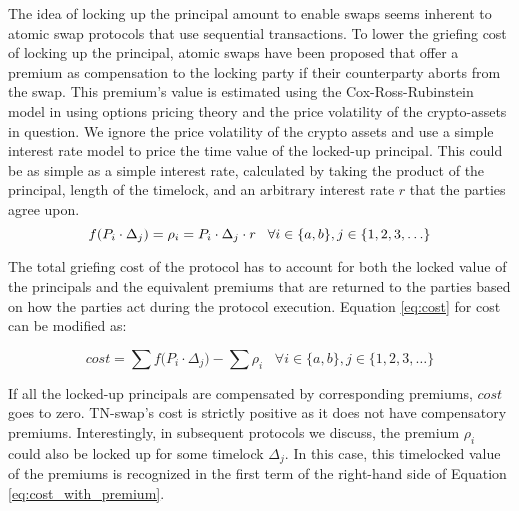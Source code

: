 The idea of locking up the principal amount to enable swaps seems inherent to atomic swap protocols that use sequential transactions. To lower the griefing cost of locking up the principal, atomic swaps have been proposed that offer a premium as compensation to the locking party if their counterparty aborts from the swap. This premium's value is estimated using the Cox-Ross-Rubinstein model in \cite{atomic_swaps_american_call_options} using options pricing theory and the price volatility of the crypto-assets in question. We ignore the price volatility of the crypto assets and use a simple interest rate model to price the time value of the locked-up principal. This could be as simple as a simple interest rate, calculated by taking the product of the principal, length of the timelock, and an arbitrary interest rate $r$ that the parties agree upon. 
\begin{equation} 
 f(P_i\cdot \Delta_j) = \rho_i = P_i \cdot \Delta_j \cdot r \;\;\; \forall i \in \{a, b\}, j \in \{1, 2, 3, \ldots\} \\
\end{equation}

The total griefing cost of the protocol has to account for both the locked value of the principals and the equivalent premiums that are returned to the parties based on how the parties act during the protocol execution. Equation \ref{eq:cost} for cost can be modified as:

\begin{equation} \label{eq:cost_with_premium}
 cost = \sum{f(P_i\cdot \Delta_j}) - \sum{\rho_i} \;\;\; \forall i \in \{a, b\}, j \in \{1, 2, 3, \ldots\}
\end{equation}

If all the locked-up principals are compensated by corresponding premiums, $cost$ goes to zero. TN-swap's cost is strictly positive as it does not have compensatory premiums. Interestingly, in subsequent protocols we discuss, the premium $\rho_i$ could also be locked up for some timelock $\Delta_j$. In this case, this timelocked value of the premiums is recognized in the first term of the right-hand side of Equation \ref{eq:cost_with_premium}.

